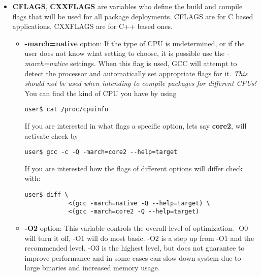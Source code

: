 \documentclass[10pt,a4paper]{article}
\begin{document}
            \begin{itemize}
                \item \textbf{CFLAGS}, \textbf{CXXFLAGS} are variables who define the build and compile flags that will be used for all package deployments. CFLAGS are for C based applications, CXXFLAGS are for C++ based ones.



                \begin{itemize}[label={o}]

                    \item \textbf{-march=native} option: If the type of CPU is undetermined, or if the user does not know what setting to choose, it is possible use the \textit{-march=native} settings. When this flag is used, GCC will attempt to detect the processor and automatically set appropriate flags for it. \textit{This should not be used when intending to compile packages for different CPUs!}\\
                    You can find the kind of CPU you have by using
\begin{lstlisting}[style=BashInputUser]					
user$ cat /proc/cpuinfo					
\end{lstlisting}
                    
                    If you are interested in what flags a specific option, lets say \textbf{core2}, will activate check by
\begin{lstlisting}[style=BashInputUser]
user$ gcc -c -Q -march=core2 --help=target
\end{lstlisting}
                    
                    If you are interested how the flags of different options will differ check with:
\begin{lstlisting}[style=BashInputUser]
user$ diff \
            <(gcc -march=native -Q --help=target) \
            <(gcc -march=core2 -Q --help=target)
\end{lstlisting}
                    
                    \item \textbf{-O2} option: This variable controls the overall level of optimization. $ \mbox{-O}0 $ will turn it off, $ \mbox{-O}1 $ will do most basic. $ \mbox{-O}2 $ is a step up from $ \mbox{-O}1 $ and the recommended level. $ \mbox{-O}3 $ is the highest level, but does not guarantee to improve performance and in some cases can slow down system due to large binaries and increased memory usage.
                    

\end{itemize}
\end{itemize}
\end{document}
